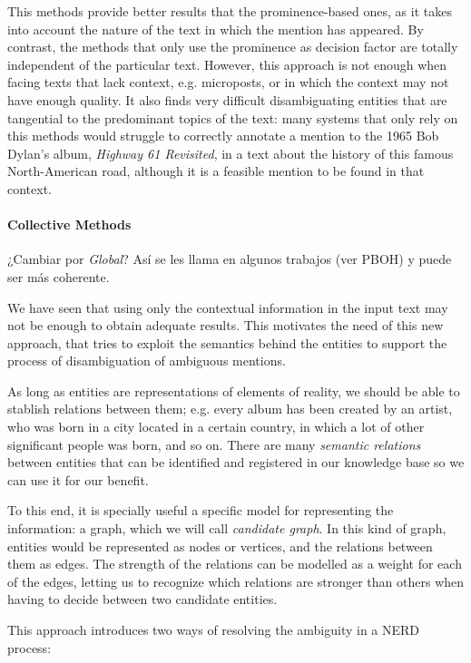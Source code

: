 This methods provide better results that the prominence-based ones, as it takes into account the nature of the text in which the mention has appeared. By contrast, the methods that only use the prominence as decision factor are totally independent of the particular text. However, this approach is not enough when facing texts that lack context, e.g. microposts, or in which the context may not have enough quality. It also finds very difficult disambiguating entities that are tangential to the predominant topics of the text: many systems that only rely on this methods would struggle to correctly annotate a mention to the 1965 Bob Dylan's album, \emph{Highway 61 Revisited}, in a text about the history of this famous North-American road, although it is a feasible mention to be found in that context.

\paragraph{Collective Methods}

{\color{red} ¿Cambiar por \emph{Global}? Así se les llama en algunos trabajos (ver PBOH) y puede ser más coherente.}

We have seen that using only the contextual information in the input text may not be enough to obtain adequate results. This motivates the need of this new approach, that tries to exploit the semantics behind the entities to support the process of disambiguation of ambiguous mentions.

As long as entities are representations of elements of reality, we should be able to stablish relations between them; e.g. every album has been created by an artist, who was born in a city located in a certain country, in which a lot of other significant people was born, and so on. There are many \emph{semantic relations} between entities that can be identified and registered in our knowledge base so we can use it for our benefit.

To this end, it is specially useful a specific model for representing the information: a graph, which we will call \emph{candidate graph}. In this kind of graph, entities would be represented as nodes or vertices, and the relations between them as edges. The strength of the relations can be modelled as a weight for each of the edges, letting us to recognize which relations are stronger than others when having to decide between two candidate entities.

This approach introduces two ways of resolving the ambiguity in a NERD process:

